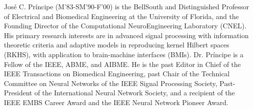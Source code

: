 \documentclass[8pt,twocolumn]{IEEEtran}
\begin{document}
\vspace{-8 mm}
\begin{IEEEbiography}
{Jos\'{e} C. Pr\'{i}ncipe}
(M'83-SM'90-F'00) is the BellSouth and Distinguished Professor of Electrical and Biomedical Engineering at the University of Florida, and the Founding Director of the Computational NeuroEngineering Laboratory (CNEL). His primary research interests
are in advanced signal processing with information theoretic criteria and adaptive models in reproducing kernel Hilbert spaces (RKHS), with application to brain-machine interfaces (BMIs). Dr.  Pr\'{i}ncipe is a Fellow of the IEEE, ABME, and AIBME. He is the past Editor in Chief of the IEEE Transactions on Biomedical Engineering, past Chair of the Technical Committee on Neural Networks of the IEEE Signal Processing Society, Past-President of the International Neural Network Society, and a recipient of the IEEE EMBS Career Award and the IEEE Neural Network Pioneer
		Award.
\end{IEEEbiography}	
\end{document}
